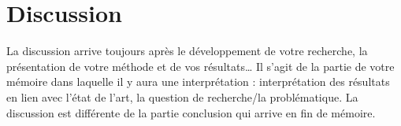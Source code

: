 \chapter{Discussion}
\label{chap:discussion}


La discussion arrive toujours après le développement de votre
recherche, la présentation de votre méthode et de vos résultats… Il
s'agit de la partie de votre mémoire dans laquelle il y aura une
interprétation : interprétation des résultats en lien avec l'état de
l'art, la question de recherche/la problématique. La discussion est
différente de la partie conclusion qui arrive en fin de mémoire.
